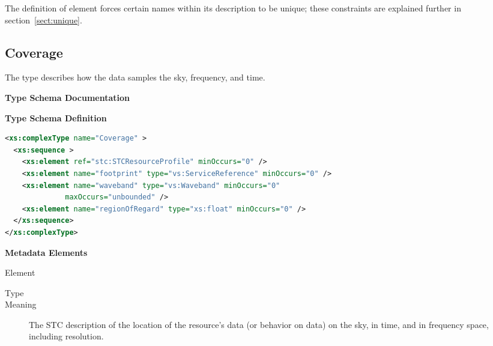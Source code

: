 \documentclass[11pt,a4paper]{ivoa}
\begin{document}

The definition of  element forces certain
names within its description to be unique; these constraints are explained
further in section~\ref{sect:unique}.

\subsection{Coverage}
\label{sect:cover}


The  type describes how the data samples the
sky, frequency, and time.  



\begin{generated}
\begingroup
      	\renewcommand*\descriptionlabel[1]{%
      	\hbox to 5.5em{\emph{#1}\hfil}}\vspace{2ex}\noindent\textbf{ Type Schema Documentation}


\vspace{1ex}\noindent\textbf{ Type Schema Definition}

\begin{lstlisting}[language=XML,basicstyle=\footnotesize]
<xs:complexType name="Coverage" >
  <xs:sequence >
    <xs:element ref="stc:STCResourceProfile" minOccurs="0" />
    <xs:element name="footprint" type="vs:ServiceReference" minOccurs="0" />
    <xs:element name="waveband" type="vs:Waveband" minOccurs="0"
              maxOccurs="unbounded" />
    <xs:element name="regionOfRegard" type="xs:float" minOccurs="0" />
  </xs:sequence>
</xs:complexType>
\end{lstlisting}

\vspace{0.5ex}\noindent\textbf{ Metadata Elements}

\begingroup\small\begin{bigdescription}\item[Element \xmlel{}]
\begin{description}
\item[Type] 
\item[Meaning] 
                 The STC description of the location of the resource's 
                 data (or behavior on data) on the sky, in time, and in 
                 frequency space, including resolution. 
               

\end{description}
\end{bigdescription}
\end{generated}
\end{document}
